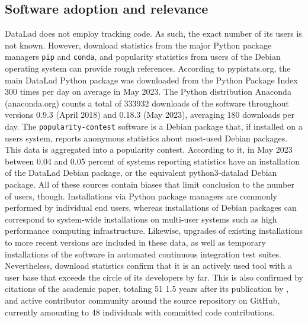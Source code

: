 \subsection{Software adoption and relevance}

DataLad does not employ tracking code.
As such, the exact number of its users is not known.
However, download statistics from the major Python package managers \texttt{pip} and \texttt{conda}, and popularity statistics from users of the Debian operating system can provide rough references.
According to pypistats.org, the main DataLad Python package was downloaded from the Python Package Index 300 times per day on average in May 2023.
The Python distribution Anaconda (anaconda.org) counts a total of 333932 downloads of the software throughout versions 0.9.3 (April 2018) and 0.18.3 (May 2023), averaging 180 downloads per day.
The \texttt{popularity-contest} software is a Debian package that, if installed on a users system, reports anonymous statistics about most-used Debian packages.
This data is aggregated into a popularity contest.
According to it, in May 2023 between 0.04 and 0.05 percent of systems reporting statistics have an installation of the DataLad Debian package, or the equivalent python3-datalad Debian package.
All of these sources contain biases that limit conclusion to the number of users, though.
Installations via Python package managers are commonly performed by individual end users, whereas installations of Debian packages can correspond to system-wide installations on multi-user systems such as high performance computing infrastructure.
Likewise, upgrades of existing installations to more recent versions are included in these data, as well as temporary installations of the software in automated continuous integration test suites.
Nevertheless, download statistics confirm that it is an actively used tool with a user base that exceeds the circle of its developers by far.
This is also confirmed by citations of the academic paper, totaling 51 1.5 years after its publication by \citet{Halchenko2021}, and active contributor community around the source repository on GitHub, currently amounting to 48 individuals with committed code contributions.



\pagebreak

